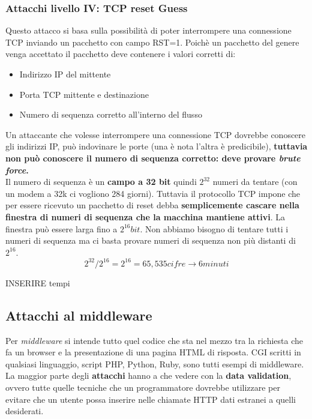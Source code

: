\documentclass[12pt]{article}
\begin{document}
			\subsubsection{Attacchi livello IV: TCP reset Guess}
				Questo attacco si basa sulla possibilità di poter interrompere una connessione TCP inviando un pacchetto con campo RST=1. Poichè un pacchetto del genere venga accettato il pacchetto deve contenere i valori corretti di:
				\begin{itemize}
					\item Indirizzo IP del mittente
					\item Porta TCP mittente e destinazione
					\item Numero di sequenza corretto all'interno del flusso
				\end{itemize}
				Un attaccante che volesse interrompere una connessione TCP dovrebbe conoscere gli indirizzi IP, può indovinare le porte (una è nota l'altra è predicibile), \textbf{tuttavia non può conoscere il numero di sequenza corretto: deve provare \textit{brute force}.}\\
				Il numero di sequenza è un \textbf{campo a 32 bit} quindi $2^{32}$ numeri da tentare (con un modem a 32k ci vogliono 284 giorni). Tuttavia il protocollo TCP impone che per essere ricevuto un pacchetto di reset debba \textbf{semplicemente cascare nella finestra di numeri di sequenza che la macchina mantiene attivi}. La finestra può essere larga fino a $2^{16} bit$. Non abbiamo bisogno di tentare tutti i numeri di sequenza ma ci basta provare numeri di sequenza non più distanti di $2^{16}$.
				$$2^{32}/2^{16} = 2^{16} = 65,535 cifre \rightarrow 6 minuti$$
				
				INSERIRE tempi\\
				
		\subsection{Attacchi al middleware}
			Per \textit{middleware} si intende tutto quel codice che sta nel mezzo tra la richiesta che fa un browser e la presentazione di una pagina HTML di risposta. CGI scritti in qualsiasi linguaggio, script PHP, Python, Ruby, sono tutti esempi di middleware.\\
			La maggior parte degli \textbf{attacchi} hanno a che vedere con la \textbf{data validation}, ovvero tutte quelle tecniche che un programmatore dovrebbe utilizzare per evitare che un utente possa inserire nelle chiamate HTTP dati estranei a quelli desiderati. 
\end{document}
